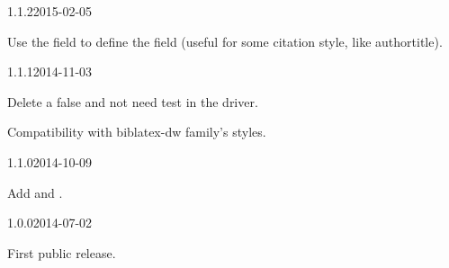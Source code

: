 \documentclass{ltxdockit}[2011/03/25]
\begin{document}
\begin{changelog}

\begin{release}{1.1.2}{2015-02-05}
\item Use the  field to define the  field (useful for some citation style, like authortitle).
\end{release}

\begin{release}{1.1.1}{2014-11-03}
\item Delete a false and not need test in the driver.
\item Compatibility with biblatex-dw family's styles.
\end{release}
\begin{release}{1.1.0}{2014-10-09}
\item Add  and .
\end{release}

\begin{release}{1.0.0}{2014-07-02}
\item First public release.
\end{release}
\end{changelog}
\end{document}

